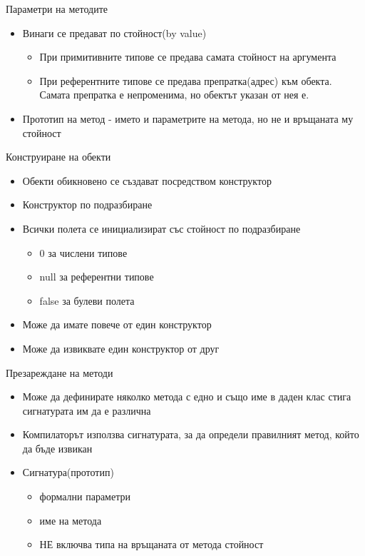 \documentclass{beamer}
\begin{document}
\begin{frame}{Параметри на методите}
  \transdissolve
  \begin{itemize}
  \item Винаги се предават по стойност(by value)
    \begin{itemize}
      \item При примитивните типове се предава самата стойност на
        аргумента
      \item При референтните типове се предава препратка(адрес) към
        обекта. Самата препратка е непроменима, но обектът указан от
        нея е.
    \end{itemize}

  \item Прототип на метод - името и параметрите на метода, но не и
    връщаната му стойност
  \end{itemize}
\end{frame}

\begin{frame}{Конструиране на обекти}
  \transdissolve
  \begin{itemize}
  \item Обекти обикновено се създават посредством конструктор
  \item Конструктор по подразбиране
  \item Всички полета се инициализират със стойност по подразбиране
    \begin{itemize}
      \item 0 за числени типове
      \item null за референтни типове
      \item false за булеви полета
    \end{itemize}
  \item Може да имате повече от един конструктор
  \item Може да извиквате един конструктор от друг
  \end{itemize}
\end{frame}

\begin{frame}{Презареждане на методи}
  \transdissolve
  \begin{itemize}
  \item Може да дефинирате няколко метода с едно и също име в даден
    клас стига сигнатурата им да е различна
  \item Компилаторът използва сигнатурата, за да определи правилният
    метод, който да бъде извикан
  \item Сигнатура(прототип)
    \begin{itemize}
      \item формални параметри
      \item име на метода
      \item НЕ включва типа на връщаната от метода стойност
    \end{itemize}
  \end{itemize}
\end{frame}
\end{document}
